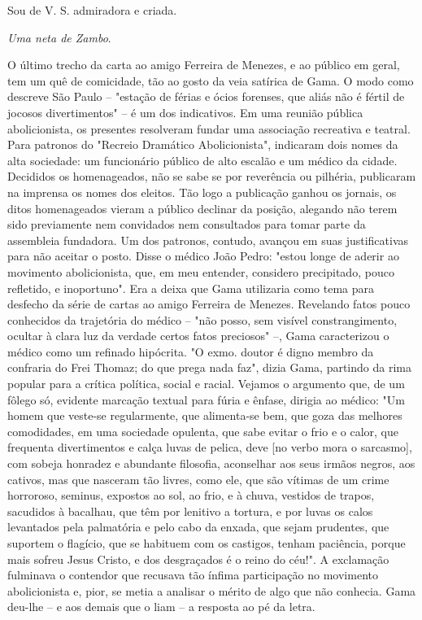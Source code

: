 Sou de V. S. admiradora e criada.

\emph{Uma neta de Zambo}.

\pagebreak
\mbox{}\vfill
\thispagestyle{empty}

{\small\noindent
O último trecho da carta ao amigo Ferreira de Menezes, e ao
público em geral, tem um quê de comicidade, tão ao gosto da veia
satírica de Gama. O modo como descreve São Paulo -- "estação de férias e
ócios forenses, que aliás não é fértil de jocosos divertimentos" -- é um
dos indicativos. Em uma reunião pública abolicionista, os presentes
resolveram fundar uma associação recreativa e teatral. Para patronos do
"Recreio Dramático Abolicionista", indicaram dois nomes da alta
sociedade: um funcionário público de alto escalão e um médico da cidade.
Decididos os homenageados, não se sabe se por reverência ou pilhéria,
publicaram na imprensa os nomes dos eleitos. Tão logo a publicação
ganhou os jornais, os ditos homenageados vieram a público declinar da
posição, alegando não terem sido previamente nem convidados nem
consultados para tomar parte da assembleia fundadora. Um dos patronos,
contudo, avançou em suas justificativas para não aceitar o posto. Disse
o médico João Pedro: "estou longe de aderir ao movimento abolicionista,
que, em meu entender, considero precipitado, pouco refletido, e
inoportuno". Era a deixa que Gama utilizaria como tema para desfecho da
série de cartas ao amigo Ferreira de Menezes. Revelando fatos pouco
conhecidos da trajetória do médico -- "não posso, sem visível
constrangimento, ocultar à clara luz da verdade certos fatos preciosos"
--, Gama caracterizou o médico como um refinado hipócrita. "O exmo.
doutor é digno membro da confraria do Frei Thomaz; do que prega nada
faz", dizia Gama, partindo da rima popular para a crítica política,
social e racial. Vejamos o argumento que, de um fôlego só, evidente
marcação textual para fúria e ênfase, dirigia ao médico: "Um homem que
veste-se regularmente, que alimenta-se bem, que goza das melhores
comodidades, em uma sociedade opulenta, que sabe evitar o frio e o
calor, que frequenta divertimentos e calça luvas de pelica, deve {[}no
verbo mora o sarcasmo{]}, com sobeja honradez e abundante filosofia,
aconselhar aos seus irmãos negros, aos cativos, mas que nasceram tão
livres, como ele, que são vítimas de um crime horroroso, seminus,
expostos ao sol, ao frio, e à chuva, vestidos de trapos, sacudidos à
bacalhau, que têm por lenitivo a tortura, e por luvas os calos
levantados pela palmatória e pelo cabo da enxada, que sejam prudentes,
que suportem o flagício, que se habituem com os castigos, tenham
paciência, porque mais sofreu Jesus Cristo, e dos desgraçados é o reino
do céu!". A exclamação fulminava o contendor que recusava tão ínfima
participação no movimento abolicionista e, pior, se metia a analisar o
mérito de algo que não conhecia. Gama deu-lhe -- e aos demais que o liam
-- a resposta ao pé da letra.}

